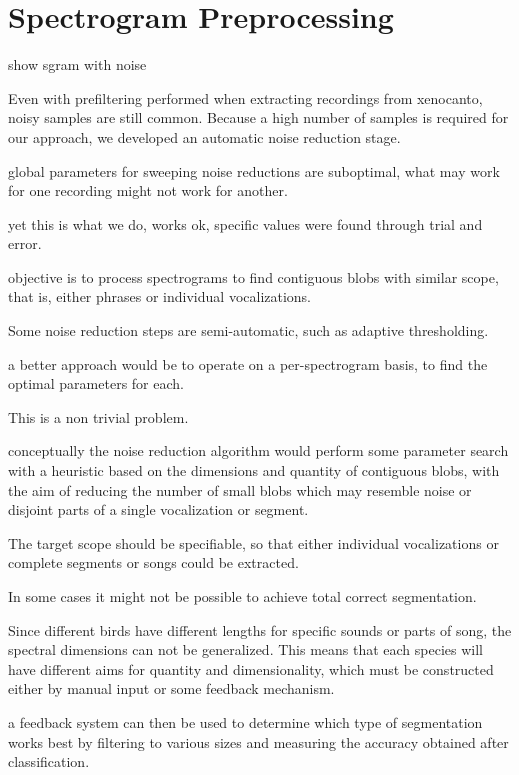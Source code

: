 \section{Spectrogram Preprocessing}

show sgram with noise

Even with prefiltering performed when extracting recordings from xenocanto,
noisy samples are still common.
Because a high number of samples is required for our approach, we developed an
automatic noise reduction stage.

global parameters for sweeping noise reductions are suboptimal, what may work
for one recording might not work for another.

yet this is what we do, works ok, specific values were found through trial and
error.

objective is to process spectrograms to find contiguous blobs with similar
scope, that is, either phrases or individual vocalizations.

Some noise reduction steps are semi-automatic, such as adaptive thresholding.

a better approach would be to operate on a per-spectrogram basis, to find the
optimal parameters for each.

This is a non trivial problem.

conceptually the noise reduction algorithm would perform some parameter search
with a heuristic based on the dimensions and quantity of contiguous blobs, with
the aim of reducing the number of small blobs which may resemble noise or disjoint
parts of a single vocalization or segment.

The target scope should be specifiable, so that either individual vocalizations
or complete segments or songs could be extracted.

In some cases it might not be possible to achieve total correct segmentation.

Since different birds have different lengths for specific sounds or parts of song,
the spectral dimensions can not be generalized.
This means that each species will have different aims for quantity and dimensionality,
which must be constructed either by manual input or some feedback mechanism.

a feedback system can then be used to determine which type of segmentation works
best by filtering to various sizes and measuring the accuracy obtained after
classification.
